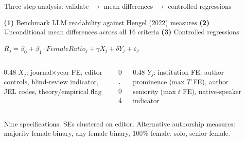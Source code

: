 \documentclass[aspectratio=169,11pt]{beamer}
\begin{document}
\begin{frame}{Three-step analysis: validate $\rightarrow$ mean differences $\rightarrow$ controlled regressions}
    \vfill
    \begin{center}
        {\normalsize
        \textbf{(1)} Benchmark LLM readability against Hengel (2022) measures\quad
        \textbf{(2)} Unconditional mean differences across all 16 criteria\quad
        \textbf{(3)} Controlled regressions
        }
    \end{center}
    \vspace{0.4cm}
    \begin{center}
        {\large
        $R_j = \beta_0 + \beta_1 \cdot \textit{FemaleRatio}_j
             + \gamma X_j + \delta Y_j + \varepsilon_j$}
    \end{center}
    \vspace{0.4cm}
    \begin{columns}[T, onlytextwidth]
        \begin{column}{0.48\textwidth}
            \RaggedRight
            {\normalsize
            $X_j$: journal$\times$year FE, editor controls, blind-review indicator, JEL codes, theory/empirical flag}
        \end{column}
        \begin{column}{0.04\textwidth}\end{column}
        \begin{column}{0.48\textwidth}
            \RaggedRight
            {\normalsize
            $Y_j$: institution FE, author prominence (max $T$ FE), author seniority (max $t$ FE), native-speaker indicator}
        \end{column}
    \end{columns}
    \vspace{0.4cm}
    \begin{center}
        {\small\color{WarmGray}
        Nine specifications. SEs clustered on editor. Alternative authorship measures: majority-female binary, any-female binary, 100\% female, solo, senior female.}
    \end{center}
    \vfill
\end{frame}
\end{document}
